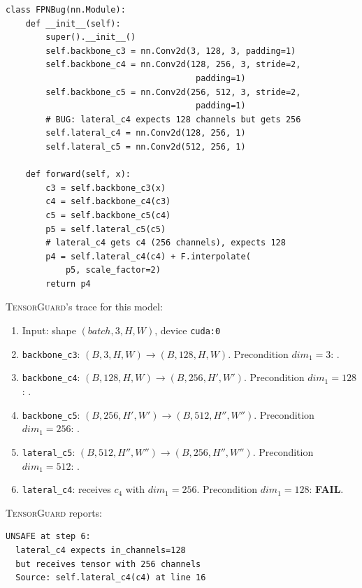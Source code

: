 \documentclass[10pt]{article}
\newcommand{\tguard}{\textsc{TensorGuard}}
\theoremstyle{plain}
\theoremstyle{definition}
\theoremstyle{remark}
\begin{document}
\begin{lstlisting}[caption={FPN lateral connection bug from
  torchvision-style code.  The lateral projection has mismatched
  input channels.},
  label={lst:fpn}]
class FPNBug(nn.Module):
    def __init__(self):
        super().__init__()
        self.backbone_c3 = nn.Conv2d(3, 128, 3, padding=1)
        self.backbone_c4 = nn.Conv2d(128, 256, 3, stride=2,
                                      padding=1)
        self.backbone_c5 = nn.Conv2d(256, 512, 3, stride=2,
                                      padding=1)
        # BUG: lateral_c4 expects 128 channels but gets 256
        self.lateral_c4 = nn.Conv2d(128, 256, 1)
        self.lateral_c5 = nn.Conv2d(512, 256, 1)

    def forward(self, x):
        c3 = self.backbone_c3(x)
        c4 = self.backbone_c4(c3)
        c5 = self.backbone_c5(c4)
        p5 = self.lateral_c5(c5)
        # lateral_c4 gets c4 (256 channels), expects 128
        p4 = self.lateral_c4(c4) + F.interpolate(
            p5, scale_factor=2)
        return p4
\end{lstlisting}

\tguard{}'s trace for this model:
\begin{enumerate}[nosep]
  \item Input: shape $(\mathit{batch}, 3, H, W)$, device \texttt{cuda:0}
  \item \texttt{backbone\_c3}: $(B, 3, H, W) \to (B, 128, H, W)$.
    Precondition $\mathit{dim}_1 = 3$: \checkmark.
  \item \texttt{backbone\_c4}: $(B, 128, H, W) \to (B, 256, H', W')$.
    Precondition $\mathit{dim}_1 = 128$: \checkmark.
  \item \texttt{backbone\_c5}: $(B, 256, H', W') \to (B, 512, H'', W'')$.
    Precondition $\mathit{dim}_1 = 256$: \checkmark.
  \item \texttt{lateral\_c5}: $(B, 512, H'', W'') \to (B, 256, H'', W'')$.
    Precondition $\mathit{dim}_1 = 512$: \checkmark.
  \item \texttt{lateral\_c4}: receives $c_4$ with $\mathit{dim}_1 = 256$.
    Precondition $\mathit{dim}_1 = 128$: \textbf{FAIL}.
\end{enumerate}

\tguard{} reports:
\begin{lstlisting}[style=noline]
UNSAFE at step 6:
  lateral_c4 expects in_channels=128
  but receives tensor with 256 channels
  Source: self.lateral_c4(c4) at line 16
\end{lstlisting}
\end{document}
